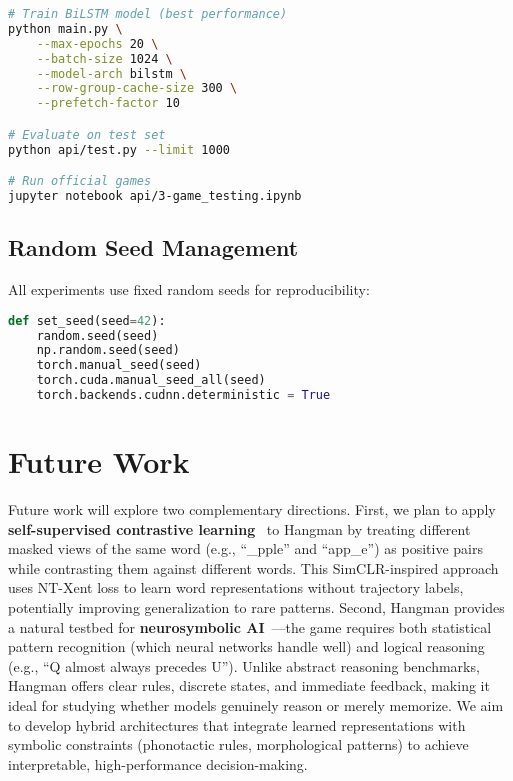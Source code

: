 \documentclass[12pt,a4paper]{article}
\begin{document}
\begin{lstlisting}[language=bash, caption={Training Command}]
# Train BiLSTM model (best performance)
python main.py \
    --max-epochs 20 \
    --batch-size 1024 \
    --model-arch bilstm \
    --row-group-cache-size 300 \
    --prefetch-factor 10

# Evaluate on test set
python api/test.py --limit 1000

# Run official games
jupyter notebook api/3-game_testing.ipynb
\end{lstlisting}

\subsection{Random Seed Management}

All experiments use fixed random seeds for reproducibility:
\begin{lstlisting}[language=Python]
def set_seed(seed=42):
    random.seed(seed)
    np.random.seed(seed)
    torch.manual_seed(seed)
    torch.cuda.manual_seed_all(seed)
    torch.backends.cudnn.deterministic = True
\end{lstlisting}

\section{Future Work}

Future work will explore two complementary directions. First, we plan to apply \textbf{self-supervised contrastive learning}~\cite{chen2020simclr,gao2021simcse} to Hangman by treating different masked views of the same word (e.g., ``\_pple'' and ``app\_e'') as positive pairs while contrasting them against different words. This SimCLR-inspired approach uses NT-Xent loss to learn word representations without trajectory labels, potentially improving generalization to rare patterns. Second, Hangman provides a natural testbed for \textbf{neurosymbolic AI}~\cite{garcez2019neurosymbolic}—the game requires both statistical pattern recognition (which neural networks handle well) and logical reasoning (e.g., ``Q almost always precedes U''). Unlike abstract reasoning benchmarks, Hangman offers clear rules, discrete states, and immediate feedback, making it ideal for studying whether models genuinely reason or merely memorize. We aim to develop hybrid architectures that integrate learned representations with symbolic constraints (phonotactic rules, morphological patterns) to achieve interpretable, high-performance decision-making.
\end{document}
